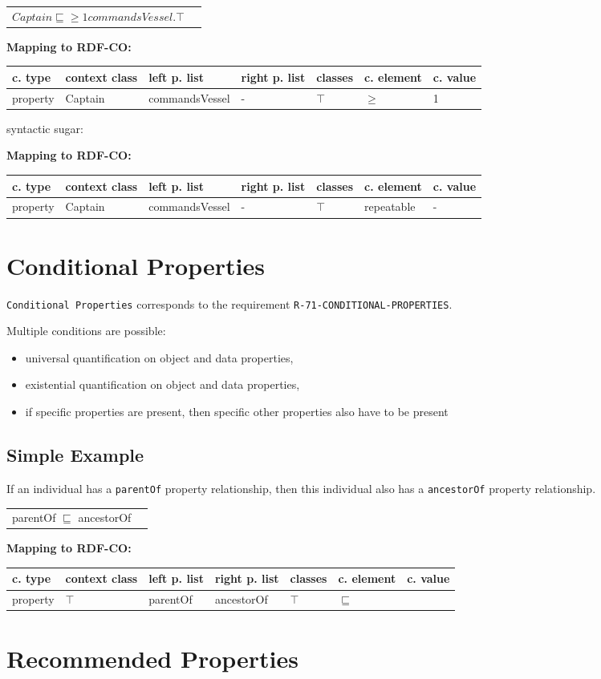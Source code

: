 \documentclass{llncs}
\newcommand{\ms}[1]{\texttt{#1}}
\newenvironment{gcotable}{
  \scriptsize
  \sffamily
  \vspace{0cm}
	\begin{center}
	\textbf{\vspace{0.4cm}Mapping to RDF-CO:} \\
  \begin{tabular}{l|l|l|l|l|l|l}
	\hline
  \textbf{c. type} & \textbf{context class} & \textbf{left p. list} & \textbf{right p. list} & \textbf{classes} & \textbf{c. element} & \textbf{c. value} \\
  \hline

}{
  \hline
  \end{tabular}
	\end{center}
}
\newenvironment{DL}{
  \vspace{0cm}
	\begin{center}
  \begin{tabular}{r l}

}{
  \end{tabular}
	\end{center}
}
\begin{document}
\begin{DL}
$Captain \sqsubseteq \geq1 commandsVessel.\top $
\end{DL}

\begin{gcotable}
property & Captain & commandsVessel & - & $\top$ & $\geq$ & 1 \\
\end{gcotable}

syntactic sugar:

\begin{gcotable}
property & Captain & commandsVessel & - & $\top$ & repeatable & - \\
\end{gcotable}

\section{Conditional Properties}

\ms{Conditional Properties} corresponds to the requirement \ms{R-71-CONDITIONAL-PROPERTIES}.

Multiple conditions are possible:

\begin{itemize}
  \item universal quantification on object and data properties,
  \item existential quantification on object and data properties,
  \item if specific properties are present, then specific other properties also have to be present
\end{itemize}

\subsection{Simple Example}

If an individual has a \ms{parentOf} property relationship, then this individual also has a \ms{ancestorOf} property relationship.

\begin{DL}
parentOf $\sqsubseteq$ ancestorOf 
\end{DL}

\begin{gcotable}
property & $\top$ & parentOf & ancestorOf & $\top$ & $\sqsubseteq$ \\
\end{gcotable}

\section{Recommended Properties}
\end{document}
